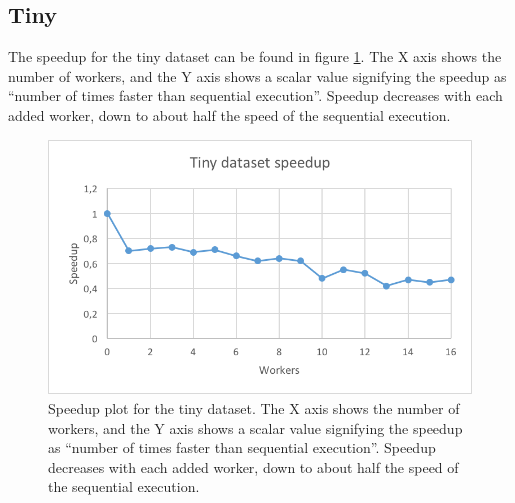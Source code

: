 \subsection{Tiny}
The speedup for the tiny dataset can be found in figure \ref{fig:dataset_1_speedup}.
The X axis shows the number of workers, and the Y axis shows a scalar value signifying the speedup as
``number of times faster than sequential execution''. Speedup decreases with each added worker, down to about half the speed of the sequential execution.
\begin{figure}[ht]
  \centering
  \includegraphics[width=120mm]{figures/dataset_1/dataset_1_speedup.png}
  \caption[Speedup plot for tiny dataset.]{Speedup plot for the tiny dataset. The X axis shows the number of workers, and the Y axis shows a scalar value signifying the speedup as
  ``number of times faster than sequential execution''. Speedup decreases with each added worker, down to about half the speed of the sequential execution.}
  \label{fig:dataset_1_speedup}
\end{figure}


